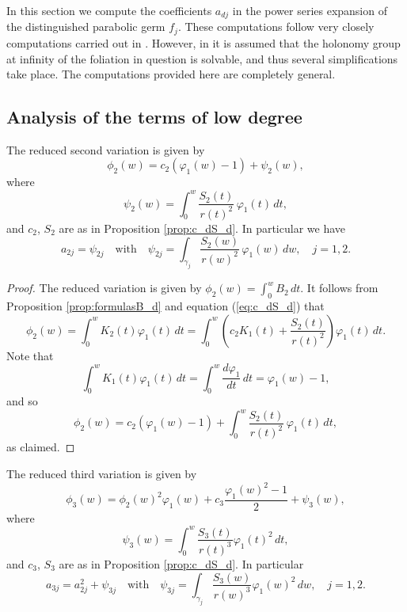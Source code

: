 


In this section we compute the coefficients $a_{dj}$ in the power series expansion of the distinguished parabolic germ $f_j$. These computations follow very closely computations carried out in \cite{Pyartli2006}. However, in \cite{Pyartli2006} it is assumed that the holonomy group at infinity of the foliation in question is solvable, and thus several simplifications take place. The computations provided here are completely general.



\subsection{Analysis of the terms of low degree}


\begin{proposition}\label{prop:secondvar}
The reduced second variation is given by
\[ \phi_2(w)=c_2(\varphi_1(w)-1)+\psi_2(w), \]
where 
\[ \psi_2(w)=\int_{0}^{w}\frac{S_2(t)}{r(t)^2}\,\varphi_1(t)\,dt, \]
and $c_2$, $S_2$ are as in Proposition \textnormal{\ref{prop:c_dS_d}}. In particular we have
\[ a_{2j}=\psi_{2j} \quad\text{with}\quad \psi_{2j}=\int_{\gamma_j}\frac{S_2(w)}{r(w)^2}\,\varphi_1(w)\,dw, \quad j=1,2. \]
\end{proposition}

\begin{proof}
The reduced variation is given by $\phi_2(w)=\int_0^wB_2\,dt$. It follows from Proposition \ref{prop:formulasB_d} and equation (\ref{eq:c_dS_d}) that
\[ \phi_2(w)=\int_{0}^{w} K_2(t)\varphi_1(t)\,dt=\int_{0}^{w} \left(c_2K_1(t)+\frac{S_2(t)}{r(t)^2}\right)\varphi_1(t)\,dt. \]
Note that
\[ \int_{0}^{w}K_1(t)\varphi_1(t)\,dt=\int_0^w\frac{d\varphi_1}{dt}\,dt=\varphi_1(w)-1, \]
and so
\[ \phi_2(w)=c_2(\varphi_1(w)-1)+\int_{0}^{w}\frac{S_2(t)}{r(t)^2}\,\varphi_1(t)\,dt, \]
as claimed. 
\end{proof}

\begin{proposition}\label{prop:thirdvar}
The reduced third variation is given by
\[ \phi_3(w)=\phi_2(w)^2\varphi_1(w)+c_3\frac{\varphi_1(w)^2-1}{2}+\psi_3(w), \]
where 
\[ \psi_3(w)=\int_0^w\frac{S_3(t)}{r(t)^3}\varphi_1(t)^2\,dt, \]
and $c_3$, $S_3$ are as in Proposition \textnormal{\ref{prop:c_dS_d}}. In particular 
\[ a_{3j}=a_{2j}^2+\psi_{3j} \quad\text{with}\quad \psi_{3j}=\int_{\gamma_j}\frac{S_3(w)}{r(w)^3}\varphi_1(w)^2\,dw, \quad j=1,2. \]
\end{proposition}

